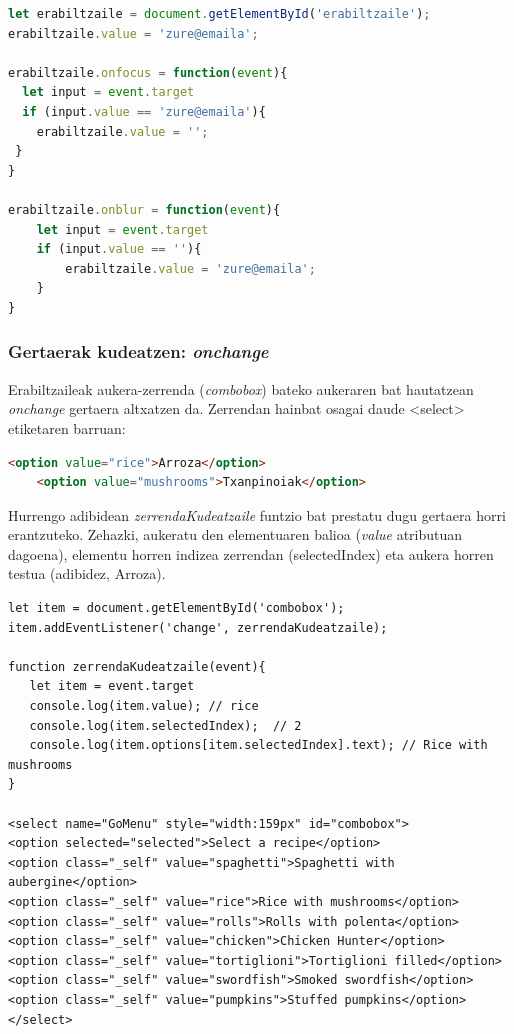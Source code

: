 \begin{lstlisting}[language=JavaScript]
let erabiltzaile = document.getElementById('erabiltzaile');
erabiltzaile.value = 'zure@emaila';

erabiltzaile.onfocus = function(event){
  let input = event.target
  if (input.value == 'zure@emaila'){
    erabiltzaile.value = '';
 }
}

erabiltzaile.onblur = function(event){
	let input = event.target
	if (input.value == ''){
	    erabiltzaile.value = 'zure@emaila';
  	}
}

\end{lstlisting}

\subsubsection{Gertaerak kudeatzen: \textit{onchange}}

Erabiltzaileak aukera-zerrenda (\textit{combobox}) bateko aukeraren bat hautatzean \textit{onchange} gertaera altxatzen da. Zerrendan hainbat osagai daude <select> etiketaren  barruan:

\begin{lstlisting}[language=HTML,numbers=none]
    <option value="rice">Arroza</option>
    <option value="mushrooms">Txanpinoiak</option>
\end{lstlisting}

Hurrengo adibidean \textit{zerrendaKudeatzaile} funtzio bat prestatu dugu gertaera horri erantzuteko. Zehazki, aukeratu den elementuaren balioa (\textit{value} atributuan dagoena), elementu horren indizea zerrendan (selectedIndex) eta aukera horren testua (adibidez, Arroza).

\begin{lstlisting}[language=HTML5]
let item = document.getElementById('combobox');
item.addEventListener('change', zerrendaKudeatzaile);

function zerrendaKudeatzaile(event){
   let item = event.target
   console.log(item.value); // rice
   console.log(item.selectedIndex);  // 2
   console.log(item.options[item.selectedIndex].text); // Rice with mushrooms
}

<select name="GoMenu" style="width:159px" id="combobox">
<option selected="selected">Select a recipe</option>
<option class="_self" value="spaghetti">Spaghetti with aubergine</option>
<option class="_self" value="rice">Rice with mushrooms</option>
<option class="_self" value="rolls">Rolls with polenta</option>
<option class="_self" value="chicken">Chicken Hunter</option>
<option class="_self" value="tortiglioni">Tortiglioni filled</option>
<option class="_self" value="swordfish">Smoked swordfish</option>
<option class="_self" value="pumpkins">Stuffed pumpkins</option>
</select>
\end{lstlisting}

